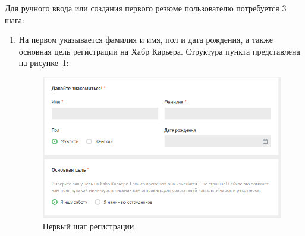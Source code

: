 \documentclass[master, och, pract]{SCWorks}
\begin{document}
Для ручного ввода или создания первого резюме пользователю потребуется 3 шага:
\begin{enumerate}
    \item На первом указывается фамилия и имя, пол и дата рождения, а также основная цель 
    регистрации на Хабр Карьера. Структура пункта представлена на рисунке~\ref{fig:6}:
    \begin{figure}[!ht]
        \centering
        \includegraphics[width=12cm]{images/image15.png}
        \caption{\label{fig:6}%
            Первый шаг регистрации}
    \end{figure}


\end{enumerate}
\end{document}

